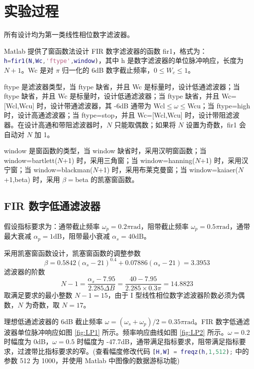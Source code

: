 \documentclass[12pt,AutoFakeBold]{article}
\begin{document}
\section{实验过程}

所有设计均为第一类线性相位数字滤波器。

Matlab 提供了窗函数法设计 FIR 数字滤波器的函数 fir1，格式为：\lstinline[language=Matlab]|h=fir1(N,Wc,'ftype',window)|，其中 h 是数字滤波器的单位脉冲响应，长度为 $N+1$。Wc 是对 $\pi$ 归一化的 6dB 数字截止频率，$0\le W_c\le1$。

ftype 是滤波器类型，当 ftype 缺省，并且 Wc 是标量时，设计低通滤波器；当 ftype 缺省，并且 Wc 是标量时，设计低通滤波器；当 ftype 缺省，并且 Wc=[Wcl,Wcu] 时，设计带通滤波器，其 -6dB 通带为 Wcl$\le\omega\le$Wcu；当 ftype=high 时，设计高通滤波器；当 ftype=stop，并且 Wc=[Wcl,Wcu] 时，设计带阻滤波器。在设计高通和带阻滤波器时，$N$ 只能取偶数；如果将 $N$ 设置为奇数，fir1 会自动对 $N$ 加 1。

window 是窗函数的类型，当 window 缺省时，采用汉明窗函数；当 window=bartlett($N$+1) 时，采用三角窗；当 window=hanning($N$+1) 时，采用汉宁窗；当 window=blackman($N$+1) 时，采用布莱克曼窗；当 window=kaiaer($N$+1,beta) 时，采用 $\beta=$beta 的凯塞窗函数。


\subsection{FIR 数字低通滤波器}

假设指标要求为：通带截止频率 $\omega_p=0.2\pi\mathrm{rad}$，阻带截止频率 $\omega_p=0.5\pi\mathrm{rad}$，通带最大衰减 $\alpha_p=1\mathrm{dB}$，阻带最小衰减 $\alpha_s=40\mathrm{dB}$。

采用凯塞窗函数设计，凯塞窗函数的调整参数
%
\begin{equation*}
\beta=0.5842(\alpha_s-21)^{0.4}+0.07886(\alpha_s-21)=3.3953
\end{equation*}
%
滤波器的阶数
%
\begin{equation*}
N-1=\frac{\alpha_s-7.95}{2.285\Delta B}=\frac{40-7.95}{2.285\times0.3\pi}=14.8823
\end{equation*}
%
取满足要求的最小整数 $N-1=15$，由于 I 型线性相位数字滤波器阶数必须为偶数，$N$ 为奇数，取 $N=17$。

理想低通滤波器的 6dB 截止频率 $\omega=(\omega_s+\omega_p)/2=0.35\pi\mathrm{rad}$。FIR 数字低通滤波器单位脉冲响应如图 \ref{fig:LP1} 所示。频率响应曲线如图 \ref{fig:LP2} 所示。$\omega=0.2$ 时幅度为 0dB，$\omega=0.5$ 时幅度为 -47.7dB，通带满足指标要求，阻带满足指标要求，过渡带比指标要求的窄。(查看幅度修改代码 \lstinline[language=Matlab]|[H,W] = freqz(h,1,512);| 中的参数 512 为 1000，并使用 Matlab 中图像的数据游标功能)
\end{document}
